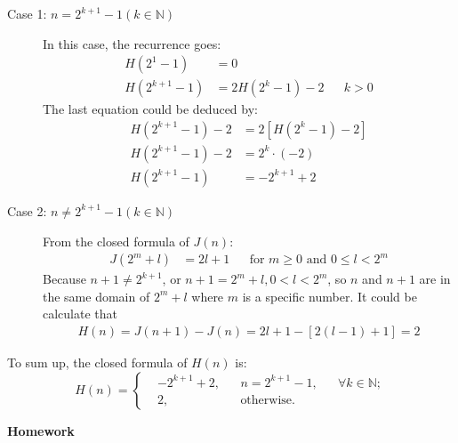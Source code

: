 \documentclass[a4paper,12pt]{article}
\makeatletter
\newtheorem*{solution}{Solution}
\theoremstyle{definition}
\renewenvironment{solution}[1][Solution] {\par\pushQED{\qed}\normalfont\topsep6\p@\@plus6\p@\relax\trivlist\item[\hskip\labelsep\bfseries#1\@addpunct{.}]\ignorespaces}{\popQED\endtrivlist\@endpefalse} \makeatother
\newenvironment{problems}{\begin{list}{}{\renewcommand{\makelabel}[1]{\textbf{##1}\hfil}}}{\end{list}}
\makeatother
\begin{document}
\begin{problems}
\begin{solution}
        \begin{description}
            \item[Case 1: $n=2^{k+1}-1(k\in \mathbb{N})$] In this case, the recurrence goes:
            \begin{align*}
                H(2^1-1)&=0&&\\
                H(2^{k+1}-1)&=2H(2^k-1)-2&&k>0
            \end{align*} 
            The last equation could be deduced by:
            \begin{align*}
                H(2^{k+1}-1)-2&=2\left[H(2^k-1)-2\right]\\
                H(2^{k+1}-1)-2&=2^k\cdot (-2)\\
                H(2^{k+1}-1)&=-2^{k+1}+2
            \end{align*}
            \item[Case 2: $n\neq 2^{k+1}-1(k\in \mathbb{N})$] From the closed formula of $J(n)$:
            \begin{align*}
                J(2^m+l)&=2l+1&&\text{for $m\geq 0$ and $0\leq l<2^m$}
            \end{align*} 
            Because $n+1\neq 2^{k+1}$, or $n+1=2^m+l,0<l<2^m$, so $n$ and $n+1$ are in the same domain of $2^m+l$ where $m$ is a specific number. It could be calculate that
            \begin{align*}
                H(n)=J(n+1)-J(n)=2l+1-\left[2(l-1)+1\right] = 2
            \end{align*}
        \end{description}

        To sum up, the closed formula of $H(n)$ is:
        \begin{equation*}
            H(n)=\left\{\begin{aligned}
                &-2^{k+1}+2,&&n=2^{k+1}-1,&&\forall k\in \mathbb{N};\\
                &2,&&\text{otherwise.}
            \end{aligned}\right.
        \end{equation*}
    \end{solution}

\end{problems}

\noindent\textbf{Homework}
\end{document}
